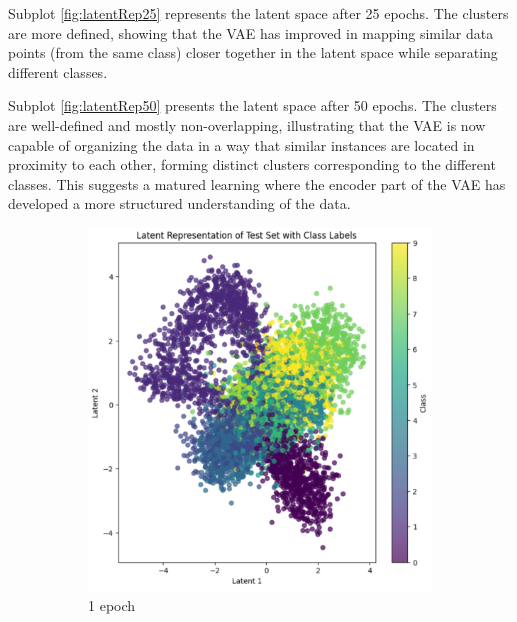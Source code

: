 Subplot \ref{fig:latentRep25} represents the latent space after 25 epochs. The clusters are more defined, showing that the VAE has improved in mapping similar data points (from the same class) closer together in the latent space while separating different classes.

Subplot \ref{fig:latentRep50} presents the latent space after 50 epochs. The clusters are well-defined and mostly non-overlapping, illustrating that the VAE is now capable of organizing the data in a way that similar instances are located in proximity to each other, forming distinct clusters corresponding to the different classes. This suggests a matured learning where the encoder part of the VAE has developed a more structured understanding of the data.

\begin{figure}[H]
    \centering
    \begin{subfigure}[b]{0.45\textwidth}
        \centering
        \includegraphics[width=\textwidth]{images/3-latentRep1.png}
        \caption{1 epoch}
        \label{fig:latentRep1}
    \end{subfigure}
    \begin{subfigure}[b]{0.45\textwidth}
        \centering

\end{subfigure}
\end{figure}
